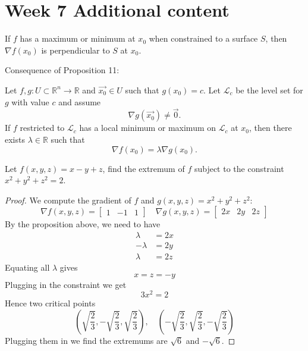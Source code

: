 \documentclass[openany]{book}
\begin{document}
\newpage 
\section*{\centering Week 7 Additional content}



\renewcommand\thesection{\arabic{section}}

\noindent


\begin{prop}
    If $f$ has a maximum or minimum
    at $x_0$ when constrained to a surface $S$, then $\nabla f(x_0)$ is perpendicular to $S$ at $x_0$.
\end{prop}
Consequence of Proposition 11:
\begin{prop}
Let \( f, g : U \subset \mathbb{R}^n \to \mathbb{R} \) and \(\vec{x_0} \in U\) such that \( g({x_0}) = c \). Let \( \mathcal{L}_c \) be the level set for \( g \) with value \( c \) and assume  
\[
\nabla g(\vec{x_0}) \neq \vec{0}.
\] 
If \( f \) restricted to \( \mathcal{L}_c \) has a local minimum or maximum on \( \mathcal{L}_c \) at \( {x_0} \), then there exists \( \lambda \in \mathbb{R} \) such that  
\[
\nabla f({x_0}) = \lambda \nabla g({x_0}).
\]
\end{prop}


\begin{prob}
Let $f(x,y,z)=x-y+z$, find the extremum of $f$ subject to the constraint $x^2+y^2+z^2=2$.
\end{prob}
\begin{proof}
    We compute the gradient of $f$ and $g(x,y,z)=x^2+y^2+z^2$:
    \begin{equation*}
        \nabla f(x,y,z)=\begin{bmatrix}
            1&-1&1
        \end{bmatrix}\quad \nabla g(x,y,z)=\begin{bmatrix}
            2x&2y&2z
        \end{bmatrix}
    \end{equation*}
    By the proposition above, we need to have 
    \begin{align*}
        \lambda&=2x\\
        -\lambda&=2y\\
        \lambda&=2z
    \end{align*}
    Equating all $\lambda$ gives 
    \begin{equation*}
        x=z=-y
    \end{equation*}
    Plugging in the constraint we get 
    \begin{equation*}
        3x^2=2
    \end{equation*}
    Hence two critical points 
    \begin{equation*}
        \left(\sqrt{\frac{2}{3}}, -\sqrt{\frac{2}{3}}, \sqrt{\frac{2}{3}}\right), \quad \left(-\sqrt{\frac{2}{3}}, \sqrt{\frac{2}{3}}, -\sqrt{\frac{2}{3}}\right)
    \end{equation*}
    Plugging them in we find the extremums are $\sqrt{6}$ and $-\sqrt{6}$.
\end{proof}
\end{document}
